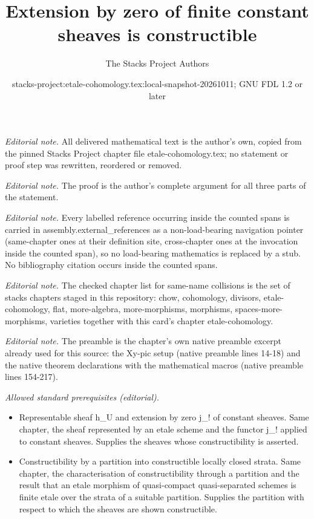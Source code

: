 \documentclass[10pt,a4paper]{amsart}
\title{Extension by zero of finite constant sheaves is constructible}
\author{The Stacks Project Authors}
\date{stacks-project:etale-cohomology.tex:local-snapshot-20261011; GNU FDL 1.2 or later}
\theoremstyle{plain}
\theoremstyle{definition}
\theoremstyle{remark}
\numberwithin{equation}{subsection}
\begin{document}
\maketitle
\noindent\textit{Editorial note.} All delivered mathematical text is the author's own, copied from the pinned Stacks Project chapter file etale-cohomology.tex; no statement or proof step was rewritten, reordered or removed.\par\medskip
\noindent\textit{Editorial note.} The proof is the author's complete argument for all three parts of the statement.\par\medskip
\noindent\textit{Editorial note.} Every labelled reference occurring inside the counted spans is carried in assembly.external\_references as a non-load-bearing navigation pointer (same-chapter ones at their definition site, cross-chapter ones at the invocation inside the counted span), so no load-bearing mathematics is replaced by a stub. No bibliography citation occurs inside the counted spans.\par\medskip
\noindent\textit{Editorial note.} The checked chapter list for same-name collisions is the set of stacks chapters staged in this repository: chow, cohomology, divisors, etale-cohomology, flat, more-algebra, more-morphisms, morphisms, spaces-more-morphisms, varieties together with this card's chapter etale-cohomology.\par\medskip
\noindent\textit{Editorial note.} The preamble is the chapter's own native preamble excerpt already used for this source: the Xy-pic setup (native preamble lines 14-18) and the native theorem declarations with the mathematical macros (native preamble lines 154-217).\par\medskip
\noindent\textit{Allowed standard prerequisites (editorial).}\begin{itemize}
\item Representable sheaf h\_U and extension by zero j\_! of constant sheaves. Same chapter, the sheaf represented by an etale scheme and the functor j\_! applied to constant sheaves. Supplies the sheaves whose constructibility is asserted.
\item Constructibility by a partition into constructible locally closed strata. Same chapter, the characterisation of constructibility through a partition and the result that an etale morphism of quasi-compact quasi-separated schemes is finite etale over the strata of a suitable partition. Supplies the partition with respect to which the sheaves are shown constructible.
\end{itemize}\medskip
\end{document}
